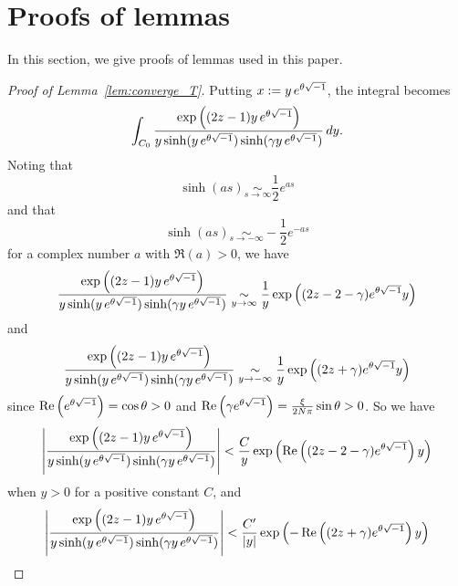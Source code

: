 \section{Proofs of lemmas}\label{sec:proofs_lemmas}
In this section, we give proofs of lemmas used in this paper.
\begin{proof}[Proof of Lemma~\ref{lem:converge_T}]
Putting $x:=y\,e^{\theta\sqrt{-1}}$, the integral becomes
\begin{equation*}
  \int_{C_{0}}
  \frac{\exp\left((2z-1)y\,e^{\theta\sqrt{-1}}\right)}
       {y\sinh(y\,e^{\theta\sqrt{-1}})\sinh(\gamma y\,e^{\theta\sqrt{-1}})}
  \,dy.
\end{equation*}
Noting that
\begin{equation*}
  \sinh(as)
  \underset{s\to\infty}{\sim}
  \frac{1}{2}e^{as}
\end{equation*}
and that
\begin{equation*}
  \sinh(as)
  \underset{s\to-\infty}{\sim}
  -\frac{1}{2}e^{-as}
\end{equation*}
for a complex number $a$ with $\Re(a)>0$, we have
\begin{equation*}
  \frac{\exp\left((2z-1)y\,e^{\theta\sqrt{-1}}\right)}
       {y\sinh(y\,e^{\theta\sqrt{-1}})\sinh(\gamma y\,e^{\theta\sqrt{-1}})}
  \underset{y\to\infty}{\sim}
  \frac{1}{y}
  \exp
  \left(
    (2z-2-\gamma)e^{\theta\sqrt{-1}}y
  \right)
\end{equation*}
and
\begin{equation*}
  \frac{\exp\left((2z-1)y\,e^{\theta\sqrt{-1}}\right)}
       {y\sinh(y\,e^{\theta\sqrt{-1}})\sinh(\gamma y\,e^{\theta\sqrt{-1}})}
  \underset{y\to-\infty}{\sim}
  \frac{1}{y}
  \exp
  \left(
    (2z+\gamma)e^{\theta\sqrt{-1}}y
  \right)
\end{equation*}
since $\operatorname{Re}\left(e^{\theta\sqrt{-1}}\right)=\cos\theta>0$ and $\operatorname{Re}\left(\gamma e^{\theta\sqrt{-1}}\right)=\frac{\xi}{2N\pi}\sin\theta>0$.
So we have
\begin{equation*}
  \left|
  \frac{\exp\left((2z-1)y\,e^{\theta\sqrt{-1}}\right)}
       {y\sinh(y\,e^{\theta\sqrt{-1}})\sinh(\gamma y\,e^{\theta\sqrt{-1}})}
  \right|
  <
  \frac{C}{y}
  \exp
  \left(
    \operatorname{Re}\left((2z-2-\gamma)e^{\theta\sqrt{-1}}\right)y
  \right)
\end{equation*}
when $y>0$ for a positive constant $C$, and
\begin{equation*}
  \left|
  \frac{\exp\left((2z-1)y\,e^{\theta\i}\right)}
       {y\sinh(y\,e^{\theta\i})\sinh(\gamma y\,e^{\theta\i})}
  \right|
  <
  \frac{C'}{|y|}
  \exp
  \left(
    -\Re\left((2z+\gamma)e^{\theta\i}\right)y
  \right)

\end{equation*}
\end{proof}
